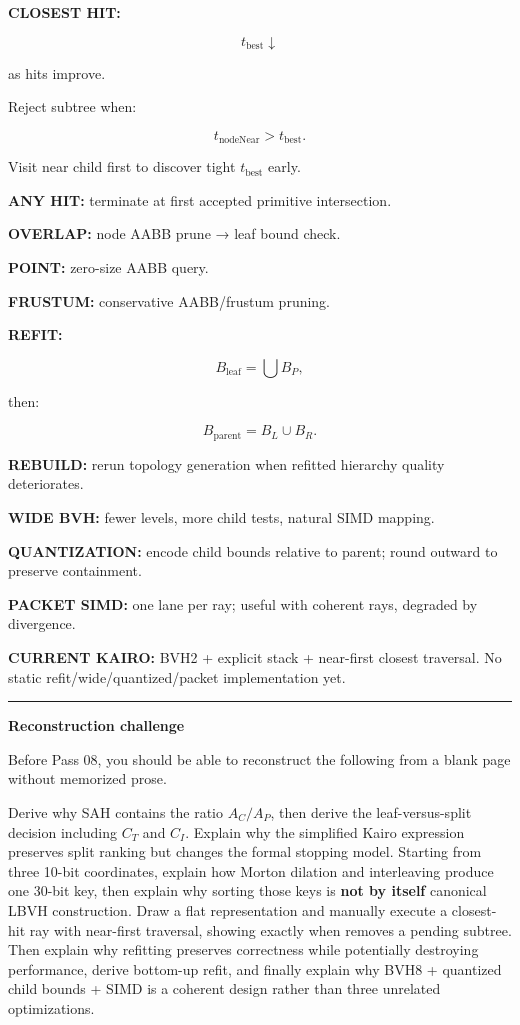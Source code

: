 \textbf{CLOSEST HIT:}

\[
t_{\text{best}}
\downarrow
\]

as hits improve.

Reject subtree when:

\[
t_{\text{nodeNear}}>t_{\text{best}}.
\]

Visit near child first to discover tight \(t_{\text{best}}\) early.

\textbf{ANY HIT:} terminate at first accepted primitive intersection.

\textbf{OVERLAP:} node AABB prune → leaf bound check.

\textbf{POINT:} zero-size AABB query.

\textbf{FRUSTUM:} conservative AABB/frustum pruning.

\textbf{REFIT:}

\[
B_{\text{leaf}}
=
\bigcup B_P,
\]

then:

\[
B_{\text{parent}}
=
B_L\cup B_R.
\]

\textbf{REBUILD:} rerun topology generation when refitted hierarchy quality deteriorates.

\textbf{WIDE BVH:} fewer levels, more child tests, natural SIMD mapping.

\textbf{QUANTIZATION:} encode child bounds relative to parent; round outward to preserve containment.

\textbf{PACKET SIMD:} one lane per ray; useful with coherent rays, degraded by divergence.

\textbf{CURRENT KAIRO:} BVH2 + explicit stack + near-first closest traversal. No static refit/wide/quantized/packet implementation yet.

\begin{center}\rule{0.5\linewidth}{0.5pt}\end{center}

\textbf{Reconstruction challenge}

Before Pass 08, you should be able to reconstruct the following from a blank page without memorized prose.

Derive why SAH contains the ratio \(A_C/A_P\), then derive the leaf-versus-split decision including \(C_T\) and \(C_I\). Explain why the simplified Kairo expression preserves split ranking but changes the formal stopping model. Starting from three 10-bit coordinates, explain how Morton dilation and interleaving produce one 30-bit key, then explain why sorting those keys is \textbf{not by itself} canonical LBVH construction. Draw a flat  representation and manually execute a closest-hit ray with near-first traversal, showing exactly when  removes a pending subtree. Then explain why refitting preserves correctness while potentially destroying performance, derive bottom-up refit, and finally explain why BVH8 + quantized child bounds + SIMD is a coherent design rather than three unrelated optimizations.

